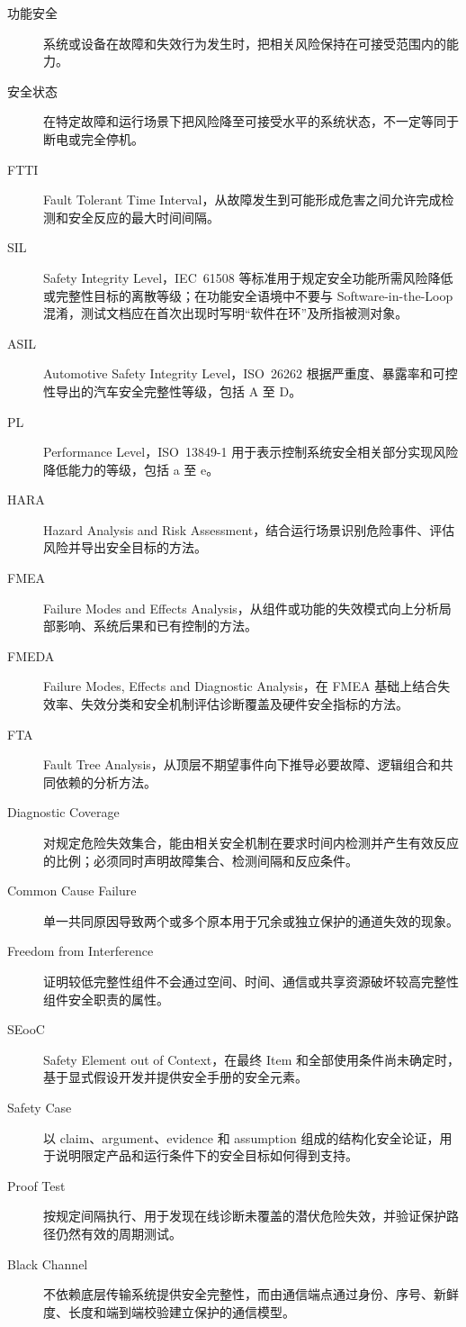 \begin{description}
  \item[功能安全] 系统或设备在故障和失效行为发生时，把相关风险保持在可接受范围内的能力。
  \item[安全状态] 在特定故障和运行场景下把风险降至可接受水平的系统状态，不一定等同于断电或完全停机。
  \item[FTTI] Fault Tolerant Time Interval，从故障发生到可能形成危害之间允许完成检测和安全反应的最大时间间隔。
  \item[SIL] Safety Integrity Level，IEC~61508 等标准用于规定安全功能所需风险降低或完整性目标的离散等级；在功能安全语境中不要与 Software-in-the-Loop 混淆，测试文档应在首次出现时写明“软件在环”及所指被测对象。
  \item[ASIL] Automotive Safety Integrity Level，ISO~26262 根据严重度、暴露率和可控性导出的汽车安全完整性等级，包括 A 至 D。
  \item[PL] Performance Level，ISO~13849-1 用于表示控制系统安全相关部分实现风险降低能力的等级，包括 a 至 e。
  \item[HARA] Hazard Analysis and Risk Assessment，结合运行场景识别危险事件、评估风险并导出安全目标的方法。
  \item[FMEA] Failure Modes and Effects Analysis，从组件或功能的失效模式向上分析局部影响、系统后果和已有控制的方法。
  \item[FMEDA] Failure Modes, Effects and Diagnostic Analysis，在 FMEA 基础上结合失效率、失效分类和安全机制评估诊断覆盖及硬件安全指标的方法。
  \item[FTA] Fault Tree Analysis，从顶层不期望事件向下推导必要故障、逻辑组合和共同依赖的分析方法。
  \item[Diagnostic Coverage] 对规定危险失效集合，能由相关安全机制在要求时间内检测并产生有效反应的比例；必须同时声明故障集合、检测间隔和反应条件。
  \item[Common Cause Failure] 单一共同原因导致两个或多个原本用于冗余或独立保护的通道失效的现象。
  \item[Freedom from Interference] 证明较低完整性组件不会通过空间、时间、通信或共享资源破坏较高完整性组件安全职责的属性。
  \item[SEooC] Safety Element out of Context，在最终 Item 和全部使用条件尚未确定时，基于显式假设开发并提供安全手册的安全元素。
  \item[Safety Case] 以 claim、argument、evidence 和 assumption 组成的结构化安全论证，用于说明限定产品和运行条件下的安全目标如何得到支持。
  \item[Proof Test] 按规定间隔执行、用于发现在线诊断未覆盖的潜伏危险失效，并验证保护路径仍然有效的周期测试。
  \item[Black Channel] 不依赖底层传输系统提供安全完整性，而由通信端点通过身份、序号、新鲜度、长度和端到端校验建立保护的通信模型。
\end{description}

